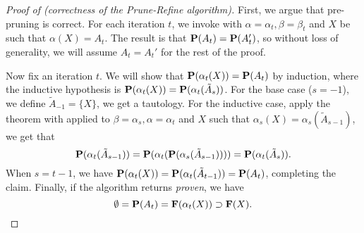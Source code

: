 \begin{proof}[Proof of  (correctness of the Prune-Refine algorithm)]
First, we argue that pre-pruning is correct.
For each iteration $t$, we invoke  with $\alpha = \alpha_t,
\beta = \beta_t$ and $X$ be such that $\alpha(X) = A_t$.
The result is that $\mathbf{P}(A_t) = \mathbf{P}(A_t')$, so without loss of generality,
we will assume $A_t = A_t'$ for the rest of the proof.

Now fix an iteration $t$.
We will show that $\mathbf{P}(\alpha_t(X)) = \mathbf{P}(A_t)$ by induction,
where the inductive hypothesis is $\mathbf{P}(\alpha_t(X)) = \mathbf{P}(\alpha_t(\tilde A_s))$.
For the base case ($s = -1$), we define $\tilde A_{-1} = \{X\}$, we get a tautology.
For the inductive case, apply the theorem with 
applied to $\beta = \alpha_s, \alpha = \alpha_t$ and $X$ such that $\alpha_s(X) = \alpha_s(\tilde A_{s-1})$,
we get that 
\[ \mathbf{P}(\alpha_t(\tilde A_{s-1})) = \mathbf{P}(\alpha_t(\mathbf{P}(\alpha_s(\tilde A_{s-1})))) = \mathbf{P}(\alpha_t(\tilde A_s)). \]
When $s = t-1$, we have $\mathbf{P}(\alpha_t(X)) = \mathbf{P}(\alpha_t(\tilde A_{t-1})) = \mathbf{P}(A_t)$,
completing the claim.
Finally, if the algorithm returns {\em proven}, we have
\[ \emptyset = \mathbf{P}(A_t) = \mathbf{F}(\alpha_t(X)) \supset \mathbf{F}(X). \]
\end{proof}
